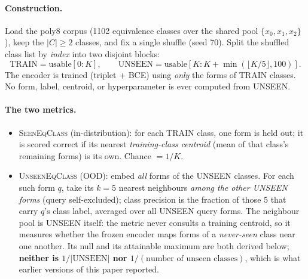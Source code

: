 \paragraph{Construction.} Load the poly8 corpus (1102 equivalence classes over the shared pool $\{x_0,x_1,x_2\}$), keep the $|C|\!\geq\!2$ classes, and fix a single shuffle (seed 70). Split the shuffled class list by \emph{index} into two disjoint blocks:
\[
\text{TRAIN} = \text{usable}[0\!:\!K], \qquad
\text{UNSEEN} = \text{usable}[K : K + \min(\lfloor K/5\rfloor, 100)].
\]
The encoder is trained (triplet + BCE) using \emph{only} the forms of TRAIN classes. No form, label, centroid, or hyperparameter is ever computed from UNSEEN.

\paragraph{The two metrics.}
\begin{itemize}[noitemsep,topsep=2pt,leftmargin=1.4em]
  \item \textsc{SeenEqClass} (in-distribution): for each TRAIN class, one form is held out; it is scored correct if its nearest \emph{training-class centroid} (mean of that class's remaining forms) is its own. Chance $=1/K$.
  \item \textsc{UnseenEqClass} (OOD): embed \emph{all} forms of the UNSEEN classes. For each such form $q$, take its $k{=}5$ nearest neighbours \emph{among the other UNSEEN forms} (query self-excluded); class precision is the fraction of those $5$ that carry $q$'s class label, averaged over all UNSEEN query forms. The neighbour pool is UNSEEN itself: the metric never consults a training centroid, so it measures whether the frozen encoder maps forms of a \emph{never-seen} class near one another. Its null and its attainable maximum are both derived below; \textbf{neither is $1/|\text{UNSEEN}|$ nor $1/(\text{number of unseen classes})$}, which is what earlier versions of this paper reported.
\end{itemize}

